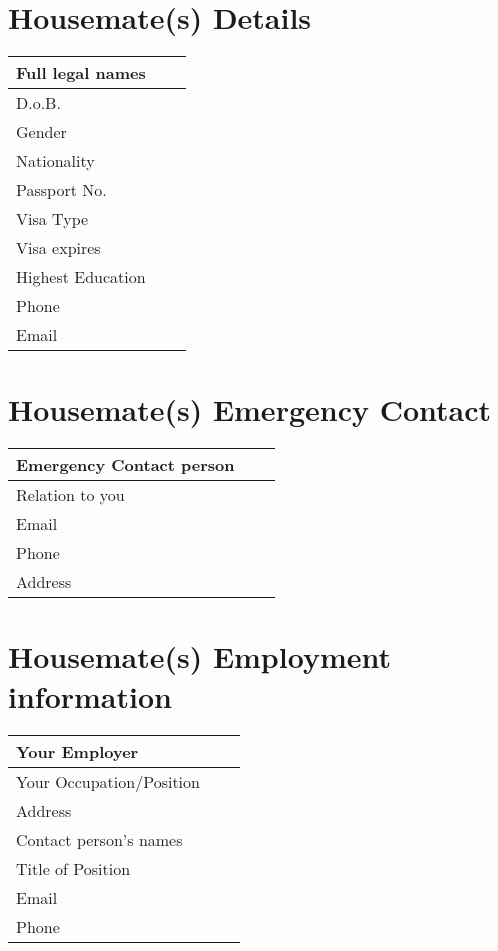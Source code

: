 \documentclass[12pt,a4paper]{article}
\begin{document}
\section*{Housemate(s) Details}
\begin{tabular}{|p{}|p{}|p{}|}
\hline
Full legal names & & \\ \hline
D.o.B. & & \\ \hline
Gender & & \\ \hline
Nationality & \\ \hline
Passport No. & \\ \hline
Visa Type & \\ \hline
Visa expires & \\ \hline
Highest Education & \\ \hline
Phone & \\ \hline
Email & \\ \hline
\end{tabular}

\vspace{1cm}

\section*{Housemate(s) Emergency Contact}
\begin{tabular}{|p{}|p{}|p{}|}
\hline
Emergency Contact person & & \\ \hline
Relation to you & & \\ \hline
Email & & \\ \hline
Phone & & \\ \hline
Address & & \\ \hline
\end{tabular}

\vspace{1cm}

\section*{Housemate(s) Employment information}
\begin{tabular}{|p{}|p{}|p{}|}
\hline
Your Employer & & \\ \hline
Your Occupation/Position & & \\ \hline
Address & & \\ \hline
Contact person's names & & \\ \hline
Title of Position & & \\ \hline
Email & & \\ \hline
Phone & & \\ \hline
\end{tabular}
\end{document}
